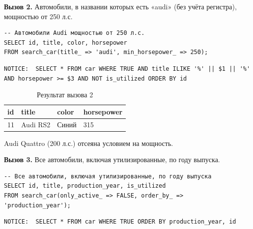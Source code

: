 \documentclass[oneside,a4paper,14pt]{extarticle}
\begin{document}
\textbf{Вызов 2.} Автомобили, в названии которых есть «audi» (без учёта регистра), мощностью от 250 л.с.

\begin{verbatim}
-- Автомобили Audi мощностью от 250 л.с.
SELECT id, title, color, horsepower
FROM search_car(title_ => 'audi', min_horsepower_ => 250);
\end{verbatim}

\begin{Verbatim}[fontsize=\footnotesize,breaklines=true]
NOTICE:  SELECT * FROM car WHERE TRUE AND title ILIKE '%' || $1 || '%' AND horsepower >= $3 AND NOT is_utilized ORDER BY id
\end{Verbatim}

\begin{table}[H]
\centering
\footnotesize
\caption{Результат вызова 2}\label{tab:dyn2}
\begin{tabular}{|l|l|l|l|}
\hline
\textbf{id} & \textbf{title} & \textbf{color} & \textbf{horsepower} \\ \hline
11 & Audi RS2 & Синий & 315 \\ \hline
\end{tabular}
\end{table}

Audi Quattro (200 л.с.) отсеяна условием на мощность.

\textbf{Вызов 3.} Все автомобили, включая утилизированные, по году выпуска.

\begin{verbatim}
-- Все автомобили, включая утилизированные, по году выпуска
SELECT id, title, production_year, is_utilized
FROM search_car(only_active_ => FALSE, order_by_ => 'production_year');
\end{verbatim}

\begin{Verbatim}[fontsize=\footnotesize,breaklines=true]
NOTICE:  SELECT * FROM car WHERE TRUE ORDER BY production_year, id
\end{Verbatim}
\end{document}
